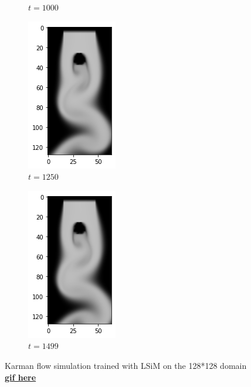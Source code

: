 \documentclass[a4paper,12pt,twoside]{report}
\begin{document}
\begin{figure}
\begin{subfigure}{0.18\textwidth}
		\caption{$t=1000$}
	\end{subfigure}
	\begin{subfigure}{0.18\textwidth}
		\centering
		\includegraphics[scale=0.5]{karmanflow/lsim_density_001250.png}
		\caption{$t=1250$}
	\end{subfigure}
	\begin{subfigure}{0.18\textwidth}
		\centering
		\includegraphics[scale=0.5]{karmanflow/lsim_density_001499.png}
		\caption{$t=1499$}
	\end{subfigure}
	\caption{Karman flow simulation trained with LSiM on the 128*128 domain \href{https://github.com/w191444052/sol-data/blob/master/karman_high/lsim.gif}{\bf{gif here}}}
	\label{sol karman high lsim}
\end{figure}
\end{document}
